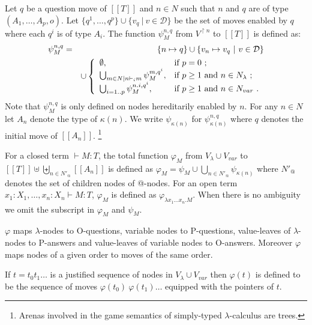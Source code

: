 \documentclass{llncs}
\newcommand\union{\cup}
\newcommand\Union{\bigcup}
\newcommand{\sem}[1]{{[\![ #1 ]\!]}}
\begin{document}
\begin{definition}\rm
\label{def:phi_psi mapping}
Let $q$ be a question move of $\sem{T}$ and $n \in N$ such that $n$
and $q$ are of type $(A_1,\ldots,A_p,o)$.  Let $\{ q^1, \ldots, q^p \}
\union \{ v_q \ | \ v \in \mathcal{D} \}$ be the set of moves enabled
by $q$ where each $q^i$ is of type $A_i$. The function $\psi_M^{n,q}$
from $V^{\upharpoonright n}$ to $\sem{T}$ is defined as:
\begin{eqnarray*}
\psi^{n,q}_M &=& \{ n \mapsto q \} \union  \{ v_n \mapsto v_q \ | \ v \in \mathcal{D} \}\\
 &&\union \left\{
                \begin{array}{ll}
                  \emptyset, & \hbox{if $p=0$\ ;} \\
                  \Union_{m \in N | n \vdash_i m} \psi_M^{m, q^i}, & \hbox{if $p\geq1$ and $n\in N_{\lambda}$\ ;} \\
                  \Union_{i=1..p} \psi_M^{n.i, q^i}, & \hbox{if $p\geq1$ and $n\in N_{var}$\ .}
                \end{array}
              \right.
\end{eqnarray*}
Note that $\psi_M^{n,q}$ is only defined on nodes hereditarily enabled
by $n$.  For any $n \in N$ let $A_n$ denote the type of
$\kappa(n)$. We write $\psi_{\kappa(n)}$ for $\psi_{\kappa(n)}^{n,q}$
where $q$ denotes the initial move of $\sem{A_n}$. \footnote{Arenas
involved in the game semantics of simply-typed $\lambda$-calculus are
trees.}


For a closed term $\vdash M : T$, the total function $\varphi_M$ from
$V_\lambda \union V_{var}$ to $\sem{T} \uplus \biguplus_{n \in N'_@}
\sem{A_n}$ is defined as $\varphi_M = \psi_M \union \Union_{n \in
N'_@} \psi_{\kappa(n)}$ where $N'_@$ denotes the set of children nodes
of @-nodes.  For an open term $x_1 : X_1, \ldots, x_n : X_n \vdash M :
T$, $\varphi_M$ is defined as $\varphi_{\lambda x_1 \ldots x_n
. M}$. When there is no ambiguity we omit the subscript in $\varphi_M$
and $\psi_M$.
\end{definition}
\begin{remark}
$\varphi$ maps $\lambda$-nodes to O-questions, variable nodes to
P-questions, value-leaves of $\lambda$-nodes to P-answers and
value-leaves of variable nodes to O-answers.
Moreover $\varphi$ maps nodes of a given order to moves of the same order.
\end{remark}
If $t = t_0 t_1 \ldots$ is a justified sequence
of nodes in $V_\lambda \union V_{var}$ then $\varphi(t)$ is defined
to be the sequence of moves $\varphi(t_0)\ \varphi(t_1) \ldots$
equipped with the pointers of $t$.
\end{document}
